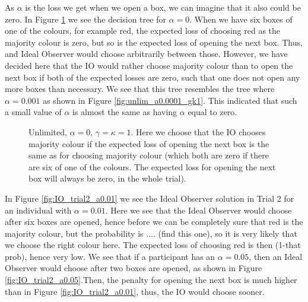 As $\alpha$ is the loss we get when we open a box, we can imagine that it also could be zero. In Figure \ref{fig:unlim_a0_gk1} we see the decision tree for $\alpha=0$. When we have six boxes of one of the colours, for example red, the expected loss of choosing red as the majority colour is zero, but so is the expected loss of opening the next box. Thus, and Ideal Observer would choose arbitrarily between those. However, we have decided here that the IO would rather choose majority colour than to open the next box if both of the expected losses are zero, such that one does not open any more boxes than necessary. We see that this tree resembles the tree where $\alpha=0.001$ as shown in Figure \ref{fig:unlim_a0.0001_gk1}. This indicated that such a small value of $\alpha$ is almost the same as having $\alpha$ equal to zero. 
\begin{figure}
    \centering
    \scalebox{0.5}{}
    \caption[IO solution, unlimited. $\alpha=0$, $\gamma=\kappa=1$]{Unlimited, $\alpha = 0$, $\gamma=\kappa=1$. Here we choose that the IO chooses majority colour if the expected loss of opening the next box is the same as for choosing majority colour (which both are zero if there are six of one of the colours. The expected loss for opening the next box will always be zero, in the whole trial).}
    \label{fig:unlim_a0_gk1}
\end{figure}

In Figure \ref{fig:IO_trial2_a0.01} we see the Ideal Observer solution in Trial 2 for an individual with $\alpha=0.01$. Here we see that the Ideal Observer would choose after six boxes are opened, hence before we can be completely sure that red is the majority colour, but the probability is .... (find this one), so it is very likely that we choose the right colour here. The expected loss of choosing red is then (1-that prob), hence very low. 
We see that if a participant has an $\alpha=0.05$, then an Ideal Observer would choose after two boxes are opened, as shown in Figure \ref{fig:IO_trial2_a0.05}.Then, the penalty for opening the next box is much higher than in Figure \ref{fig:IO_trial2_a0.01}, thus, the IO would choose sooner. 


